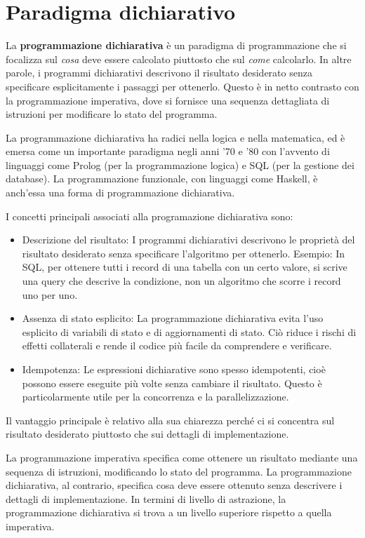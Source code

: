 \documentclass[
  letterpaper,
]{scrbook}
\providecommand{\tightlist}{%
  \setlength{\itemsep}{0pt}\setlength{\parskip}{0pt}}\usepackage{longtable,booktabs,array}
\begin{document}
\section{Paradigma dichiarativo}\label{paradigma-dichiarativo}

La \textbf{programmazione dichiarativa} è un paradigma di programmazione
che si focalizza sul \emph{cosa} deve essere calcolato piuttosto che sul
\emph{come} calcolarlo. In altre parole, i programmi dichiarativi
descrivono il risultato desiderato senza specificare esplicitamente i
passaggi per ottenerlo. Questo è in netto contrasto con la
programmazione imperativa, dove si fornisce una sequenza dettagliata di
istruzioni per modificare lo stato del programma.

La programmazione dichiarativa ha radici nella logica e nella
matematica, ed è emersa come un importante paradigma negli anni '70 e
'80 con l'avvento di linguaggi come Prolog (per la programmazione
logica) e SQL (per la gestione dei database). La programmazione
funzionale, con linguaggi come Haskell, è anch'essa una forma di
programmazione dichiarativa.

I concetti principali associati alla programazione dichiarativa sono:

\begin{itemize}
\tightlist
\item
  Descrizione del risultato: I programmi dichiarativi descrivono le
  proprietà del risultato desiderato senza specificare l'algoritmo per
  ottenerlo. Esempio: In SQL, per ottenere tutti i record di una tabella
  con un certo valore, si scrive una query che descrive la condizione,
  non un algoritmo che scorre i record uno per uno.
\item
  Assenza di stato esplicito: La programmazione dichiarativa evita l'uso
  esplicito di variabili di stato e di aggiornamenti di stato. Ciò
  riduce i rischi di effetti collaterali e rende il codice più facile da
  comprendere e verificare.
\item
  Idempotenza: Le espressioni dichiarative sono spesso idempotenti, cioè
  possono essere eseguite più volte senza cambiare il risultato. Questo
  è particolarmente utile per la concorrenza e la parallelizzazione.
\end{itemize}

Il vantaggio principale è relativo alla sua chiarezza perché ci si
concentra sul risultato desiderato piuttosto che sui dettagli di
implementazione.

La programmazione imperativa specifica come ottenere un risultato
mediante una sequenza di istruzioni, modificando lo stato del programma.
La programmazione dichiarativa, al contrario, specifica cosa deve essere
ottenuto senza descrivere i dettagli di implementazione. In termini di
livello di astrazione, la programmazione dichiarativa si trova a un
livello superiore rispetto a quella imperativa.
\end{document}
